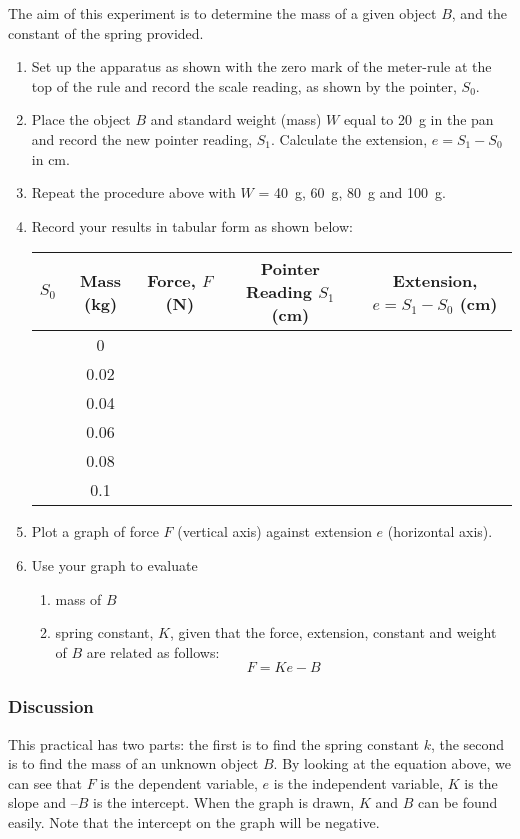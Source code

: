 \documentclass[12pt,a4paper]{report}
\begin{document}
The aim of this experiment is to determine the mass of a given object $B$, and the
constant of the spring provided.
\begin{enumerate}
\item{Set up the apparatus as shown with the zero mark of the meter-rule at the top
of the rule and record the scale reading, as shown by the pointer, $S_0$.}
\item{Place the object $B$ and standard weight (mass) $W$ equal to 20~g in the pan
and record the new pointer reading, $S_1$. Calculate the extension, $e = S_1 - S_0$ in
cm.}
\item{Repeat the procedure above with $W$ = 40~g, 60~g, 80~g and 100~g.}
\item{Record your results in tabular form as shown below:

\begin{center}
\begin{tabular}{ | c | c | c | c | c | }
\hline
$S_0$ & Mass (kg) & Force, $F$ (N) & Pointer Reading $S_1$ (cm) & Extension, $e = S_1 - S_0$ (cm) \\ \hline
& 0 & & & \\ \hline
& 0.02 & & & \\ \hline
& 0.04 & & & \\ \hline
& 0.06 & & & \\ \hline
& 0.08 & & & \\ \hline
& 0.1 & & & \\ \hline
\end{tabular}
\end{center}

}%
\item{Plot a graph of force $F$ (vertical axis) against extension $e$ (horizontal axis).}
\item{Use your graph to evaluate
\begin{enumerate}
\item{mass of $B$}
\item{spring constant, $K$, given that the force, extension, constant and
weight of $B$ are related as follows: $$F = Ke - B$$}
\end{enumerate}
}%
\end{enumerate}

\subsubsection{Discussion}

This practical has two parts: the first is to find the spring constant $k$, the second is
to find the mass of an unknown object $B$. By looking at the equation above, we
can see that $F$ is the dependent variable, $e$ is the independent variable, $K$ is the slope and
$–B$ is the intercept. When the graph is drawn, $K$ and $B$ can be found easily. Note that the
intercept on the graph will be negative.
\end{document}
